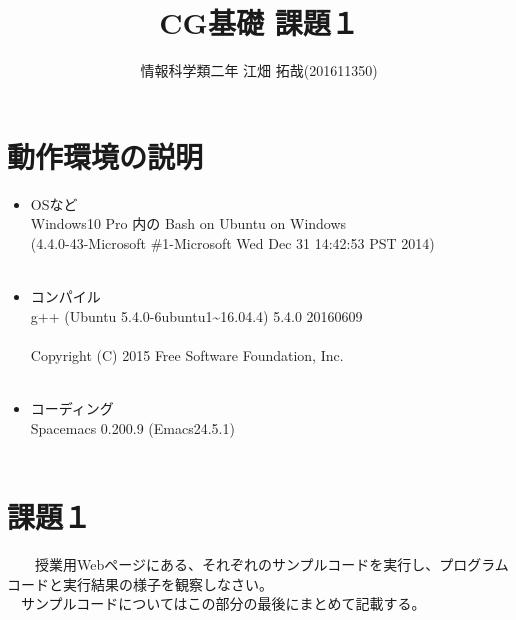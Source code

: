 \documentclass{scrartcl}
\author{情報科学類二年 江畑 拓哉(201611350)}
\date{}
\title{CG基礎 課題１}
\begin{document}
\maketitle

\section{動作環境の説明}
\label{sec:orgc40b209}
\begin{itemize}
\item OSなど\\
Windows10 Pro 内の Bash on Ubuntu on Windows\\
(4.4.0-43-Microsoft \#1-Microsoft Wed Dec 31 14:42:53 PST 2014)\\
\\
\item コンパイル\\
g++ (Ubuntu 5.4.0-6ubuntu1\textasciitilde{}16.04.4) 5.4.0 20160609\\
\\
Copyright (C) 2015 Free Software Foundation, Inc.\\
\\
\item コーディング\\
Spacemacs 0.200.9 (Emacs24.5.1)\\
\\
\end{itemize}

\newpage

\section{課題１}
\label{sec:orgb56c91f}
　　授業用Webページにある、それぞれのサンプルコードを実行し、プログラムコードと実行結果の様子を観察しなさい。\\
　サンプルコードについてはこの部分の最後にまとめて記載する。\\
\end{document}
